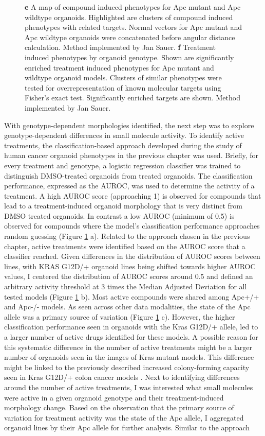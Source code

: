 \begin{flushleft}
\begin{figure}[h!]
{\textbf{e} A map of compound induced phenotypes for Apc mutant and Apc wildtype organoids. Highlighted are clusters of compound induced phenotypes with related targets. Normal vectors for Apc mutant and Apc wildtype organoids were concatenated before angular distance calculation. Method implemented by Jan Sauer.
\textbf{f} Treatment induced phenotypes by organoid genotype. Shown are significantly enriched treatment induced phenotypes for Apc mutant and wildtype organoid models. Clusters of similar phenotypes were tested for overrepresentation of known molecular targets using Fisher’s exact test. Significantly enriched targets are shown. Method implemented by Jan Sauer.
}
\label{fig_150}
\end{figure}
\bigbreak

With genotype-dependent morphologies identified, the next step was to explore genotype-dependent differences in small molecule activity. To identify active treatments, the classification-based approach developed during the study of human cancer organoid phenotypes in the previous chapter was used. Briefly, for every treatment and genotype, a logistic regression classifier was trained to distinguish DMSO-treated organoids from treated organoids. The classification performance, expressed as the AUROC, was used to determine the activity of a treatment. A high AUROC score (approaching 1) is observed for compounds that lead to a treatment-induced organoid morphology that is very distinct from DMSO treated organoids. In contrast a low AUROC (minimum of 0.5) is observed for compounds where the model's classification performance approaches random guessing (Figure \ref{fig_150} a). Related to the approach chosen in the previous chapter, active treatments were identified based on the AUROC score that a classifier reached. Given differences in the distribution of AUROC scores between lines, with KRAS G12D/+ organoid lines being shifted towards higher AUROC values, I centered the distribution of AUROC scores around 0.5 and defined an arbitrary activity threshold at 3 times the Median Adjusted Deviation for all tested models (Figure \ref{fig_150} b). Most active compounds were shared among Apc+/+ and Apc-/- models. As seen across other data modalities, the state of the Apc allele was a primary source of variation (Figure \ref{fig_150} c). However, the higher classification performance seen in organoids with the Kras G12D/+ allele, led to a larger number of active drugs identified for these models. A possible reason for this systematic difference in the number of active treatments might be a larger number of organoids seen in the images of Kras mutant models. This difference might be linked to the previously described increased colony-forming capacity seen in Kras G12D/+ colon cancer models \cite{Patankar2019-ee}. Next to identifying differences around the number of active treatments, I was interested what small molecules were active in a given organoid genotype and their treatment-induced morphology change. Based on the observation that the primary source of variation for treatment activity was the state of the Apc allele, I aggregated organoid lines by their Apc allele for further analysis. Similar to the approach 
\end{flushleft}
